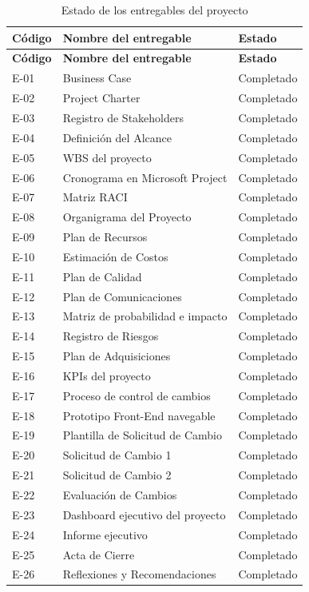 \documentclass[11pt,spanish]{article}
\begin{document}
\begin{longtable}{L{2cm} L{9cm} L{3cm}}
\caption{Estado de los entregables del proyecto}\label{tab:estado-entregables}\\[-0.5em]
\toprule
\textbf{Código} & \textbf{Nombre del entregable} & \textbf{Estado} \\
\midrule
\endfirsthead
\toprule
\textbf{Código} & \textbf{Nombre del entregable} & \textbf{Estado} \\
\midrule
\endhead
E-01 & Business Case & Completado \\
E-02 & Project Charter & Completado \\
E-03 & Registro de Stakeholders & Completado \\
E-04 & Definición del Alcance & Completado \\
E-05 & WBS del proyecto & Completado \\
E-06 & Cronograma en Microsoft Project & Completado \\
E-07 & Matriz RACI & Completado \\
E-08 & Organigrama del Proyecto & Completado \\
E-09 & Plan de Recursos & Completado \\
E-10 & Estimación de Costos & Completado \\
E-11 & Plan de Calidad & Completado \\
E-12 & Plan de Comunicaciones & Completado \\
E-13 & Matriz de probabilidad e impacto & Completado \\
E-14 & Registro de Riesgos & Completado \\
E-15 & Plan de Adquisiciones & Completado \\
E-16 & KPIs del proyecto & Completado \\
E-17 & Proceso de control de cambios & Completado \\
E-18 & Prototipo Front-End navegable & Completado \\
E-19 & Plantilla de Solicitud de Cambio & Completado \\
E-20 & Solicitud de Cambio 1 & Completado \\
E-21 & Solicitud de Cambio 2 & Completado \\
E-22 & Evaluación de Cambios & Completado \\
E-23 & Dashboard ejecutivo del proyecto & Completado \\
E-24 & Informe ejecutivo & Completado \\
E-25 & Acta de Cierre & Completado \\
E-26 & Reflexiones y Recomendaciones & Completado \\
\bottomrule
\end{longtable}
\end{document}
